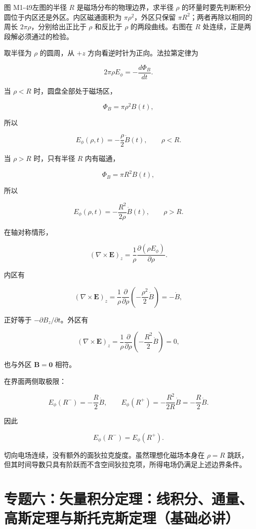 图 M1-49左图的半径 \(R\) 是磁场分布的物理边界，求半径 \(\rho\)
的环量时要先判断积分圆位于内区还是外区。内区磁通面积为
\(\pi\rho^2\)，外区只保留 \(\pi R^2\)；两者再除以相同的周长
\(2\pi\rho\)，分别给出正比于 \(\rho\) 和反比于 \(\rho\)
的两段曲线。右图在 \(R\) 处连续，正是两段解必须通过的检验。

取半径为 \(\rho\) 的圆周，从 \(+z\) 方向看逆时针为正向。法拉第定律为

\[
2\pi\rho E_{\phi}
=
-\frac{d\Phi_B}{dt}.
\]

当 \(\rho<R\) 时，圆盘全部处于磁场区，

\[
\Phi_B=\pi\rho^2B(t),
\]

所以

\[
\boxed{
E_{\phi}(\rho,t)
=
-\frac{\rho}{2}\dot B(t)
},
\qquad \rho<R.
\]

当 \(\rho>R\) 时，只有半径 \(R\) 内有磁通，

\[
\Phi_B=\pi R^2B(t),
\]

所以

\[
\boxed{
E_{\phi}(\rho,t)
=
-\frac{R^2}{2\rho}\dot B(t)
},
\qquad \rho>R.
\]

在轴对称情形，

\[
(\nabla\times\mathbf E)_z
=
\frac1\rho\frac{\partial(\rho E_{\phi})}{\partial\rho}.
\]

内区有

\[
(\nabla\times\mathbf E)_z
=
\frac1\rho\frac{\partial}{\partial\rho}
\left(
-\frac{\rho^2}{2}\dot B
\right)
=-\dot B,
\]

正好等于 \(-\partial B_z/\partial t\)。外区有

\[
(\nabla\times\mathbf E)_z
=
\frac1\rho\frac{\partial}{\partial\rho}
\left(
-\frac{R^2}{2}\dot B
\right)
=0,
\]

也与外区 \(\mathbf B=\mathbf0\) 相符。

在界面两侧取极限：

\[
E_{\phi}(R^-)
=-\frac R2\dot B,
\qquad
E_{\phi}(R^+)
=-\frac{R^2}{2R}\dot B
=-\frac R2\dot B.
\]

因此

\[
\boxed{
E_{\phi}(R^-)=E_{\phi}(R^+)
}.
\]

切向电场连续，没有额外的面狄拉克旋度。虽然理想化磁场本身在 \(\rho=R\)
跳跃，但其时间导数只具有阶跃而不含空间狄拉克项，所得电场仍满足上述边界条件。

\section{专题六：矢量积分定理：线积分、通量、高斯定理与斯托克斯定理（基础必讲）}\label{m1:ux4e13ux9898ux516dux77e2ux91cfux79efux5206ux5b9aux7406ux7ebfux79efux5206ux901aux91cfux9ad8ux65afux5b9aux7406ux4e0eux65afux6258ux514bux65afux5b9aux7406ux57faux7840ux5fc5ux8bb2}

